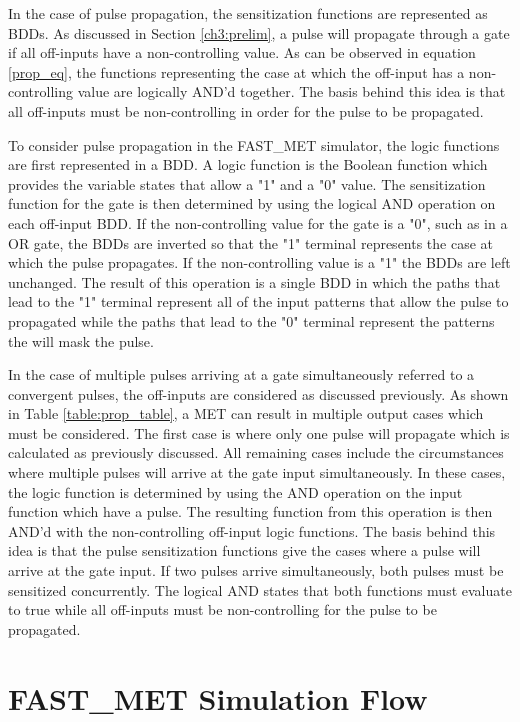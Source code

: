 In the case of pulse propagation, the sensitization functions are represented as BDDs. As discussed in Section \ref{ch3:prelim}, a pulse will propagate through a gate if all off-inputs have a non-controlling value. As can be observed in equation \ref{prop_eq}, the functions representing the case at which the off-input has a non-controlling value are logically AND'd together. The basis behind this idea is that all off-inputs must be non-controlling in order for the pulse to be propagated. 

To consider pulse propagation in the FAST\_MET simulator, the logic functions are first represented in a BDD. A logic function is the Boolean function which provides the variable states that allow a "1" and a "0" value. The sensitization function for the gate is then determined by using the logical AND operation on each off-input BDD. If the non-controlling value for the gate is a "0", such as in a OR gate, the BDDs are inverted so that the "1" terminal represents the case at which the pulse propagates. If the non-controlling value is a "1" the BDDs are left unchanged. The result of this operation is a single BDD in which the paths that lead to the "1" terminal represent all of the input patterns that allow the pulse to propagated while the paths that lead to the "0" terminal represent the patterns the will mask the pulse.

In the case of multiple pulses arriving at a gate simultaneously referred to a convergent pulses, the off-inputs are considered as discussed previously. As shown in Table \ref{table:prop_table}, a MET can result in multiple output cases which must be considered. The first case is where only one pulse will propagate which is calculated as previously discussed. All remaining cases include the circumstances where multiple pulses will arrive at the gate input simultaneously. In these cases, the logic function is determined by using the AND operation on the input function which have a pulse. The resulting function from this operation is then AND'd with the non-controlling off-input logic functions. The basis behind this idea is that the pulse sensitization functions give the cases where a pulse will arrive at the gate input. If two pulses arrive simultaneously, both pulses must be sensitized concurrently. The logical AND states that both functions must evaluate to true while all off-inputs must be non-controlling for the pulse to be propagated.

\section{FAST\_MET Simulation Flow}

